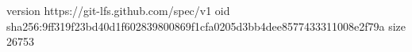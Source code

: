 version https://git-lfs.github.com/spec/v1
oid sha256:9ff319f23bd40d1f602839800869f1cfa0205d3bb4dee8577433311008e2f79a
size 26753
